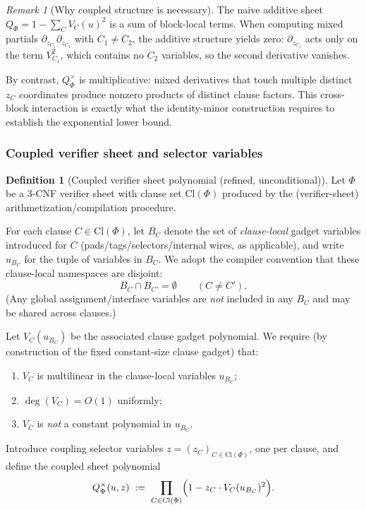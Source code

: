 \documentclass[12pt]{article}
\theoremstyle{definition}
\newtheorem{definition}{Definition}
\theoremstyle{definition}
\theoremstyle{remark}
\newtheorem{remark}{Remark}
\theoremstyle{remark}
\begin{document}
\begin{remark}[Why coupled structure is necessary]\label{rem:why-coupled}
The naive additive sheet $Q_\Phi = 1-\sum_C V_C(u)^2$ is a sum of block-local terms.
When computing mixed partials $\partial_{z_{C_1}}\partial_{z_{C_2}}$ with $C_1\neq C_2$,
the additive structure yields zero: $\partial_{z_{C_1}}$ acts only on the term $V_{C_1}^2$,
which contains no $C_2$ variables, so the second derivative vanishes.

By contrast, $Q_\Phi^{\times}$ is multiplicative: mixed derivatives that touch multiple
distinct $z_C$ coordinates produce nonzero products of distinct clause factors. This
cross-block interaction is exactly what the identity-minor construction requires to
establish the exponential lower bound.
\end{remark}


\subsubsection{Coupled verifier sheet and selector variables}

\begin{definition}[Coupled verifier sheet polynomial (refined, unconditional)]
\label{def:qphi-coupled}
Let $\Phi$ be a $3$-CNF verifier sheet with clause set $\mathrm{Cl}(\Phi)$ produced by the
(verifier-sheet) arithmetization/compilation procedure.

For each clause $C\in\mathrm{Cl}(\Phi)$, let $B_C$ denote the set of \emph{clause-local} gadget
variables introduced for $C$ (pads/tags/selectors/internal wires, as applicable), and write
$u_{B_C}$ for the tuple of variables in $B_C$. We adopt the compiler convention that
these clause-local namespaces are disjoint:
\[
B_C\cap B_{C'}=\emptyset \qquad (C\neq C').
\]
(Any global assignment/interface variables are \emph{not} included in any $B_C$ and may be
shared across clauses.)

Let $V_C(u_{B_C})$ be the associated clause gadget polynomial. We require (by construction
of the fixed constant-size clause gadget) that:
\begin{enumerate}
\item $V_C$ is multilinear in the clause-local variables $u_{B_C}$;
\item $\deg(V_C)=O(1)$ uniformly;
\item $V_C$ is \emph{not} a constant polynomial in $u_{B_C}$.
\end{enumerate}

Introduce coupling selector variables $z=(z_C)_{C\in\mathrm{Cl}(\Phi)}$, one per clause, and define
the coupled sheet polynomial
\[
Q^\times_\Phi(u,z)\;:=\;\prod_{C\in\mathrm{Cl}(\Phi)}\Bigl(1 - z_C\cdot V_C(u_{B_C})^2\Bigr).
\]
\end{definition}
\end{document}
